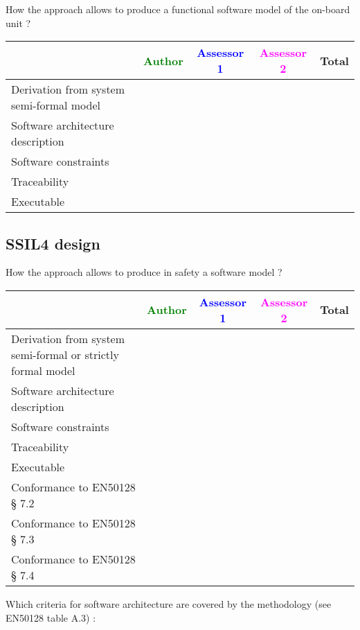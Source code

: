 How the approach allows to  produce a functional software model of the on-board unit ?

\begin{tabular}{|l | c | c | c | c|}
\hline
& \textcolor{green}{Author} & \textcolor{blue}{Assessor 1} & \textcolor{magenta}{Assessor 2} & Total \\
\hline
Derivation from system semi-formal model  & & & &  \\
\hline 
Software architecture description  & & & &  \\
\hline
Software constraints  & & & &  \\
\hline
Traceability  & & & &  \\
\hline
Executable  & & & &  \\
\hline
\end{tabular}

\subsection{SSIL4 design}

How the approach allows to  produce in safety a software model ?

\begin{tabular}{|l | c | c | c | c|}
\hline
& \textcolor{green}{Author} & \textcolor{blue}{Assessor 1} & \textcolor{magenta}{Assessor 2} & Total \\
\hline
Derivation from system semi-formal or strictly formal model  & & & &  \\
\hline 
Software architecture description  & & & &  \\
\hline
Software constraints  & & & &  \\
\hline
Traceability  & & & &  \\
\hline
Executable  & & & &  \\
\hline
Conformance to EN50128 § 7.2  & & & &  \\
\hline
Conformance to EN50128 § 7.3  & & & &  \\
\hline
Conformance to EN50128 § 7.4  & & & &  \\
\hline
\end{tabular}

Which criteria for software architecture are covered by the methodology
(see EN50128 table A.3) :

